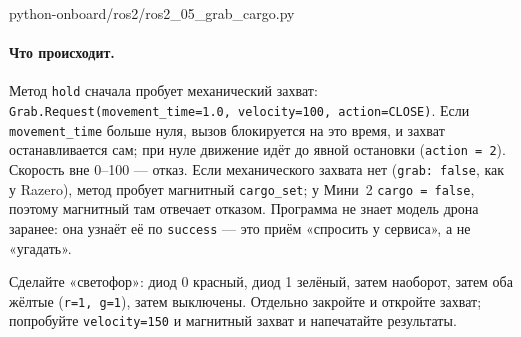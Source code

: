 \begin{codefile}[python]{python-onboard/ros2/ros2_05_grab_cargo.py}
\end{codefile}

\paragraph{Что происходит.} Метод \verb|hold| сначала пробует механический захват: \verb|Grab.Request(movement_time=1.0, velocity=100, action=CLOSE)|. Если \verb|movement_time| больше нуля, вызов блокируется на это время, и захват останавливается сам; при нуле движение идёт до явной остановки (\verb|action = 2|). Скорость вне 0--100 --- отказ. Если механического захвата нет (\verb|grab: false|, как у Razero), метод пробует магнитный \verb|cargo_set|; у Мини~2 \verb|cargo = false|, поэтому магнитный там отвечает отказом. Программа не знает модель дрона заранее: она узнаёт её по \verb|success| --- это приём «спросить у сервиса», а не «угадать».

\begin{taskbox}
Сделайте «светофор»: диод 0 красный, диод 1 зелёный, затем наоборот, затем оба жёлтые (\verb|r=1, g=1|), затем выключены. Отдельно закройте и откройте захват; попробуйте \verb|velocity=150| и магнитный захват и напечатайте результаты.
\end{taskbox}
